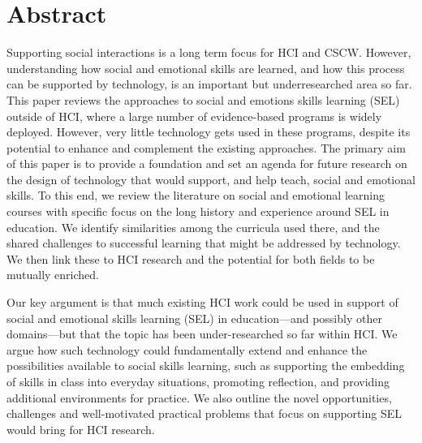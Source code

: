 \documentclass[prodmode,acmtochi]{acmsmall}
\begin{document}
\section*{Abstract} 
Supporting social interactions is a long term focus for HCI and CSCW. However, understanding how social and emotional skills are learned, and how this process can be supported by technology, is an important but underresearched area so far. 
% 
This paper reviews the approaches to social and emotions skills learning (SEL) outside of HCI, where a large number of evidence-based programs is widely deployed. However, very little technology gets used in these programs, despite its potential to enhance and complement the existing approaches.  
%
%
The primary aim of this paper is to provide a foundation and set an agenda
for future research on the design of technology that would support, and help
teach, social and emotional skills. To this end, we review the literature on social and emotional learning courses with specific focus on the long history and experience around SEL in education. We identify similarities among the curricula used there, and the shared challenges to successful learning that might be addressed by technology. We then link these to HCI research and the potential for both fields to be mutually enriched. 

Our key argument is that much existing HCI work could be used in support of social and emotional skills learning (SEL) in education---and possibly other domains---but that the topic has been under-researched so far within HCI. We argue how such technology could fundamentally extend and enhance the possibilities available to social skills learning, such as supporting the embedding of skills in class into everyday situations, promoting reflection, and providing additional environments for practice. We also outline the novel opportunities, challenges and well-motivated practical problems that focus on supporting SEL would bring for HCI research. 
\end{document}
